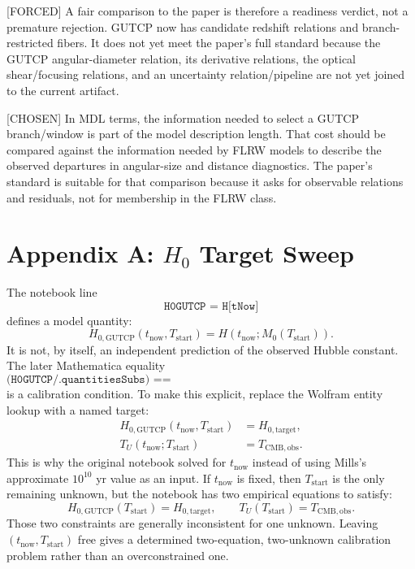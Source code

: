 \documentclass[11pt]{article}
\begin{document}
[FORCED] A fair comparison to the paper is therefore a readiness verdict, not a
premature rejection.  GUTCP now has candidate redshift relations and
branch-restricted fibers.  It does not yet meet the paper's full standard
because the GUTCP angular-diameter relation, its derivative relations, the
optical shear/focusing relations, and an uncertainty relation/pipeline are not
yet joined to the current artifact.

[CHOSEN] In MDL terms, the information needed to select a GUTCP branch/window
is part of the model description length.  That cost should be compared against
the information needed by FLRW models to describe the observed departures in
angular-size and distance diagnostics.  The paper's standard is suitable for
that comparison because it asks for observable relations and residuals, not for
membership in the FLRW class.

\section*{Appendix A: \(H_0\) Target Sweep}

The notebook line
\[
\texttt{H0GUTCP = H[tNow]}
\]
defines a model quantity:
\begin{equation}
H_{0,\mathrm{GUTCP}}(t_{\mathrm{now}},T_{\mathrm{start}})
=H(t_{\mathrm{now}};M_0(T_{\mathrm{start}})).
\end{equation}
It is not, by itself, an independent prediction of the observed Hubble
constant.  The later Mathematica equality
\[
\texttt{(H0GUTCP/.quantitiesSubs) == QuantityMagnitude[UnitConvert[Subscript[H,0]]]}
\]
is a calibration condition.  To make this explicit, replace the Wolfram entity
lookup with a named target:
\begin{align}
H_{0,\mathrm{GUTCP}}(t_{\mathrm{now}},T_{\mathrm{start}})
&=H_{0,\mathrm{target}},\\
T_U(t_{\mathrm{now}};T_{\mathrm{start}})
&=T_{\mathrm{CMB,obs}}.
\end{align}
This is why the original notebook solved for \(t_{\mathrm{now}}\) instead of
using Mills's approximate \(10^{10}\) yr value as an input.  If
\(t_{\mathrm{now}}\) is fixed, then \(T_{\mathrm{start}}\) is the only remaining
unknown, but the notebook has two empirical equations to satisfy:
\[
H_{0,\mathrm{GUTCP}}(T_{\mathrm{start}})=H_{0,\mathrm{target}},
\qquad
T_U(T_{\mathrm{start}})=T_{\mathrm{CMB,obs}}.
\]
Those two constraints are generally inconsistent for one unknown.  Leaving
\((t_{\mathrm{now}},T_{\mathrm{start}})\) free gives a determined two-equation,
two-unknown calibration problem rather than an overconstrained one.
\end{document}

